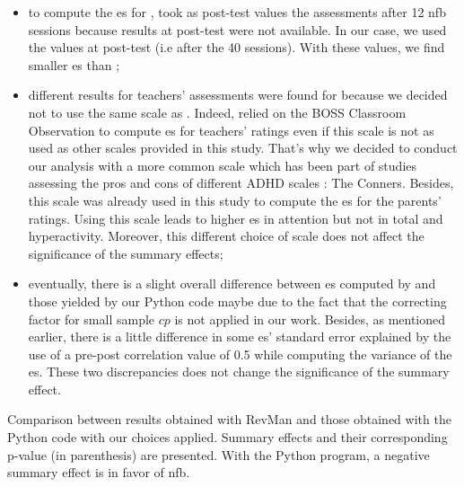 \begin{itemize}
    \item to compute the \gls{es} for \citet{Arnold2014}, \citet{Cortese2016} took as post-test values the assessments after 12 \gls{nfb} sessions
		because results at post-test were not available. In our case, we used the values at post-test (i.e after the 40 sessions). With these values, 
		we find smaller \gls{es} than \citet{Cortese2016};  
    \item different results for teachers' assessments were found for \cite{Steiner2014} because we decided not to use the same scale 
		as \citet{Cortese2016}. Indeed, \citet{Cortese2016} relied on the BOSS Classroom Observation \citep{Shapiro2010} to compute \gls{es}
		for teachers' ratings even if this scale is not as used as other scales provided in this study. That's why we decided to conduct our analysis
		with a more common scale which has been part of studies assessing the pros and cons of different ADHD scales \citep{Epstein2012, Collett2003}: The Conners. 
		Besides, this scale was already used in this study to compute the \gls{es} for the parents' ratings. 
		Using this scale leads to higher \gls{es} in attention but not in total and hyperactivity. Moreover, this different choice of 
		scale does not affect the significance of the summary effects;
		\item eventually, there is a slight overall difference between \gls{es} computed by \citet{Cortese2016} and those yielded by our Python 
		code maybe due to the fact that the correcting factor for small sample $cp$ is not applied in our work. Besides, as mentioned earlier, 
		there is a little difference in some \gls{es}' standard error explained by the use of a pre-post correlation value  of 0.5 
		while computing the variance of the \gls{es}. These two discrepancies does not change the significance of the summary effect.
\end{itemize}

\begin{table}[h!]
  \centering
  \caption{Comparison between \citet{Cortese2016} results obtained with RevMan \citep{RevMan} and those obtained with the Python code with our 
	choices applied. Summary effects and their corresponding p-value (in parenthesis) are presented. With the Python program, a negative summary 
	effect is in favor of \gls{nfb}.}

  \label{Table:meta_review_comparison_revman_and_python_with_choices}
\end{table}

